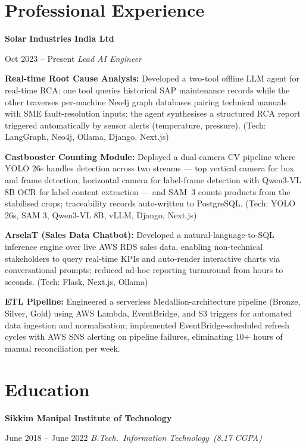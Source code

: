 \documentclass[letterpaper,10pt]{article}
\newenvironment{resume_list}{%
  \vspace{2pt}\begin{itemize}[leftmargin=20pt,itemsep=2pt,parsep=0pt,topsep=0pt]
}{%
  \end{itemize}\vspace{2pt}
}
\newcommand{\headingBf}[1]{%
  \vspace{4pt}\textbf{#1}\par
}
\newcommand{\headingIt}[2]{%
  \textit{#1}\hfill\textit{#2}\par
}
\begin{document}
\section{Professional Experience}
\headingBf{Solar Industries India Ltd}{Oct 2023 -- Present}
\headingIt{Lead AI Engineer}{}
\begin{resume_list}
  \item \textbf{Real-time Root Cause Analysis:} Developed a two-tool offline LLM agent for real-time RCA: one tool queries historical SAP maintenance records while the other traverses per-machine Neo4j graph databases pairing technical manuals with SME fault-resolution inputs; the agent synthesises a structured RCA report triggered automatically by sensor alerts (temperature, pressure). (Tech: LangGraph, Neo4j, Ollama, Django, Next.js)

  \item \textbf{Castbooster Counting Module:} Deployed a dual-camera CV pipeline where YOLO 26s handles detection across two streams --- top vertical camera for box and frame detection, horizontal camera for label-frame detection with Qwen3-VL 8B OCR for label content extraction --- and SAM~3 counts products from the stabilised crops; traceability records auto-written to PostgreSQL. (Tech: YOLO 26s, SAM 3, Qwen3-VL 8B, vLLM, Django, Next.js)


  \item \textbf{ArselaT (Sales Data Chatbot):} Developed a natural-language-to-SQL inference engine over live AWS RDS sales data, enabling non-technical stakeholders to query real-time KPIs and auto-render interactive charts via conversational prompts; reduced ad-hoc reporting turnaround from hours to seconds. (Tech: Flask, Next.js, Ollama)

  \item \textbf{ETL Pipeline:} Engineered a serverless Medallion-architecture pipeline (Bronze, Silver, Gold) using AWS Lambda, EventBridge, and S3 triggers for automated data ingestion and normalisation; implemented EventBridge-scheduled refresh cycles with AWS SNS alerting on pipeline failures, eliminating 10{+} hours of manual reconciliation per week.
\end{resume_list}

\section{Education}
\headingBf{Sikkim Manipal Institute of Technology}{June 2018 -- June 2022}
\headingIt{B.Tech.\ Information Technology~(8.17 CGPA)}{}
\end{document}
